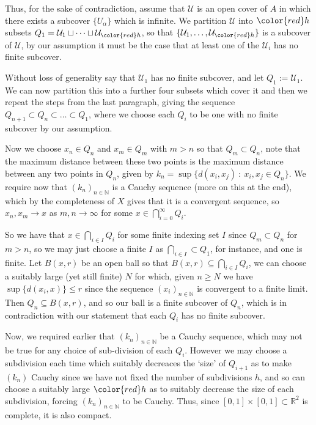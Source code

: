 \documentclass{article}
\def \N {\mathbb{N}}
\def \R {\mathbb{R}}
\begin{document}
Thus, for the sake of contradiction, assume that $\mathcal{U}$ is an open cover of $A$ in which there exists a subcover $\{U_\alpha\}$ which is infinite. We partition $\mathcal{U}$ into ${\color{red}h}$ subsets $Q_1 = \mathcal{U}_1\sqcup \dots \sqcup \mathcal{U}_{\color{red}h}$, so that $\{\mathcal{U}_1, \dots,\mathcal{U}_{\color{red}h}\}$ is a subcover of $\mathcal{U}$, by our assumption it must be the case that at least one of the $\mathcal{U}_i$ has no finite subcover.

Without loss of generality say that $\mathcal{U}_1$ has no finite subcover, and let $Q_1:=\mathcal{U}_1$. We can now partition this into a further four subsets which cover it and then we repeat the steps from the last paragraph, giving the sequence $Q_{n+1}\subset Q_n \subset\dots\subset Q_1$, where we choose each $Q_i$ to be one with  no finite subcover by our assumption.

Now we choose $x_n\in Q_n$ and $x_m\in Q_m$ with $m>n$ so that $Q_m\subset Q_n$, note that the maximum distance between these two points is the maximum distance between any two points in $Q_n$, given by $k_n=\sup\{d(x_i,x_j)\ :\ x_i,x_j\in Q_n\}$. We require now that $(k_n)_{n\in\N}$ is a Cauchy sequence (more on this at the end), which by the completeness of $X$ gives that it is a convergent sequence, so $x_n,x_m\to x$ as $m,n\to\infty$ for some $x\in\bigcap_{i=0}^\infty Q_i$. 

So we have that $x\in\bigcap_{i\in I} Q_i$ for some finite indexing set $I$ since $Q_m\subset Q_n$ for $m>n$, so we may just choose a finite $I$ as $\bigcap_{i\in I}\subset Q_1$, for instance, and one is finite. Let $B(x,r)$ be an open ball so that $B(x,r)\subseteq \bigcap_{i\in I}Q_i$, we can choose a suitably large (yet still finite) $N$ for which, given $n\geq N$ we have $\sup\{d(x_i,x)\}\leq r$ since the sequence $(x_i)_{n\in\N}$ is convergent to a finite limit. Then $Q_n\subseteq B(x,r)$, and so our ball is a finite subcover of $Q_n$, which is in contradiction with our statement that each $Q_i$ has no finite subcover. 

Now, we required earlier that $(k_n)_{n\in\N}$ be a Cauchy sequence, which may not be true for any choice of sub-division of each $Q_i$. However we may choose a subdivision each time which suitably decreaces the `size' of $Q_{i+1}$ as to make $(k_n)$ Cauchy since we have not fixed the number of subdivisions {\color{red}$h$}, and so can choose a suitably large ${\color{red}h}$ as to suitably decrease the size of each subdivision, forcing $(k_n)_{n\in\N}$ to be Cauchy. Thus, since $[0,1]\times[0,1]\subset\R^2$ is complete, it is also compact.
\end{document}
